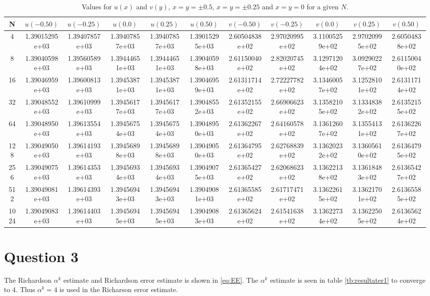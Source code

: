 \begin{table}[th!]
\centering
\begin{tabular}{c|c|c|c|c|c|c|c|c|c|c}
 N &  \( u(-0.50) \) & \( u(-0.25) \) & \( u(0.0) \) & \( u(0.25) \) & \( u(0.50) \) & \( v(-0.50) \) & \( v(-0.25) \) & \( v(0.0) \) & \( v(0.25) \) & \( v(0.50) \)  \\\hline
4&1.39015295e+03&1.39407857e+03&1.39407857e+03&1.39407857e+03&1.39015295e+03&2.60504838e+02&2.97020995e+02&3.11005259e+02&2.97020995e+02&2.60504838e+02\\
8&1.39040598e+03&1.39560589e+03&1.39444651e+03&1.39444651e+03&1.39040598e+03&2.61150040e+02&2.82020745e+02&3.12971204e+02&3.09290227e+02&2.61150040e+02
\\
16&1.39046959e+03&1.39600813e+03&1.39453871e+03&1.39453871e+03&1.39046959e+03&2.61311714e+02&2.72227782e+02&3.13460057e+02&3.12528101e+02&2.61311714e+02\\
32&1.39048552e+03&1.39610999e+03&1.39456177e+03&1.39456177e+03&1.39048552e+03&2.61352155e+02&2.66906623e+02&3.13582105e+02&3.13348382e+02&2.61352155e+02\\
64&1.39048950e+03&1.39613554e+03&1.39456754e+03&1.39456754e+03&1.39048950e+03&2.61362267e+02&2.64160578e+02&3.13612607e+02&3.13554131e+02&2.61362267e+02
 \\
128&1.39049050e+03&1.39614193e+03&1.39456898e+03&1.39456898e+03&1.39049050e+03&2.61364795e+02&2.62768839e+02&3.13620232e+02&3.13605610e+02&2.61364795e+02 \\ 
256&1.39049075e+03&1.39614353e+03&1.39456934e+03&1.39456934e+03&1.39049075e+03&2.61365427e+02&2.62068623e+02&3.13622138e+02&3.13618483e+02&2.61365427e+02\\
512&1.39049081e+03&1.39614393e+03&1.39456943e+03&1.39456943e+03&1.39049081e+03&2.61365585e+02&2.61717471e+02&3.13622615e+02&3.13621701e+02&2.61365585e+02 \\
1024&1.39049083e+03&1.39614403e+03&1.39456945e+03&1.39456945e+03&1.39049083e+03&2.61365624e+02&2.61541638e+02&3.13622734e+02&3.13622505e+02&2.61365624e+02 \\
\end{tabular}
\caption[tekst i indholdsfortegnelsen]{Values for \( u\left( x \right)  \) and  \( v\left( y \right)  \), \( x=y= \pm0.5  \), \( x=y= \pm0.25  \) and \( x=y= 0  \)  for a given \( N \).}
\label{tb:resultater}
\end{table}

\newpage
\section*{Question 3}
The Richardson $\alpha^k$ estimate and Richardson error estimate is shown in \ref{eq:EE}. The $\alpha^k$ estimate is seen in  table \ref{tb:resultater1} to converge to 4. Thus $\alpha^k = 4$ is used in the Richarson error estimate.

